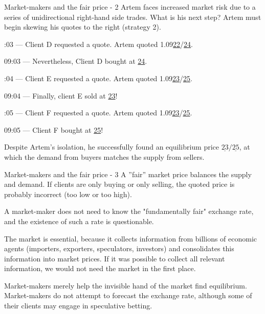 \documentclass{beamer}
\begin{document}
\begin{frame}{Market-makers and the fair price - 2}
\justify
Artem faces increased market risk due to a series of unidirectional right-hand side trades. What is his next step? Artem must begin skewing his quotes to the right (strategy 2).

:03 --- Client D requested a quote. Artem quoted 1.09\underline{22}/\underline{24}.

09:03 --- Nevertheless, Client D bought at \underline{24}.

:04 --- Client E requested a quote. Artem quoted 1.09\underline{23}/\underline{25}.

09:04 --- Finally, client E sold at \underline{23}!

:05 --- Client F requested a quote. Artem quoted 1.09\underline{23}/\underline{25}.

09:05 --- Client F bought at  \underline{25}!

\justify
Despite Artem's isolation, he successfully found an equilibrium price $\underline{23}/\underline{25}$, at which the demand from buyers matches the supply from sellers.
\end{frame}



\begin{frame}{Market-makers and the fair price - 3}
\justify
A ''fair'' market price balances the supply and demand. If clients are only buying or only selling, the quoted price
is probably incorrect (too low or too high).

\justify
A market-maker does not need to know the "fundamentally fair" exchange rate, and the existence of such a rate is questionable.

\justify
The market is essential, because it collects information from billions of economic agents (importers, exporters, speculators, investors) and consolidates this information into market prices. If it was possible to collect all relevant information, we would not need the market in the first place.

\justify
Market-makers merely help the invisible hand of the market find equilibrium. Market-makers do not attempt to forecast the exchange rate, although some of their clients may engage in speculative betting.
\end{frame}
\end{document}
